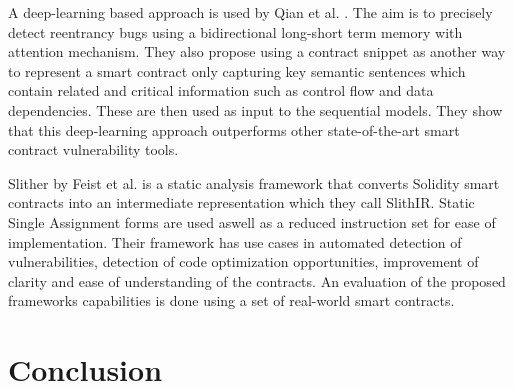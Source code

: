 \documentclass[10pt,conference]{IEEEtran}
\begin{document}
A deep-learning based approach is used by Qian et al. \cite{automated}. The aim is to precisely detect reentrancy bugs using a bidirectional long-short term memory with attention mechanism. They also propose using a contract snippet as another way to represent a smart contract only capturing key semantic sentences which contain related and critical information such as control flow and data dependencies. These are then used as input to the sequential models. They show that this deep-learning approach outperforms other state-of-the-art smart contract vulnerability tools.

Slither by Feist et al. \cite{slither} is a static analysis framework that converts Solidity smart contracts into an intermediate representation which they call SlithIR. Static Single Assignment forms are used aswell as a reduced instruction set for ease of implementation. Their framework has use cases in automated detection of vulnerabilities, detection of code optimization opportunities, improvement of clarity and ease of understanding of the contracts. An evaluation of the proposed frameworks capabilities is done using a set of real-world smart contracts. 

\section{Conclusion}







\end{document}
